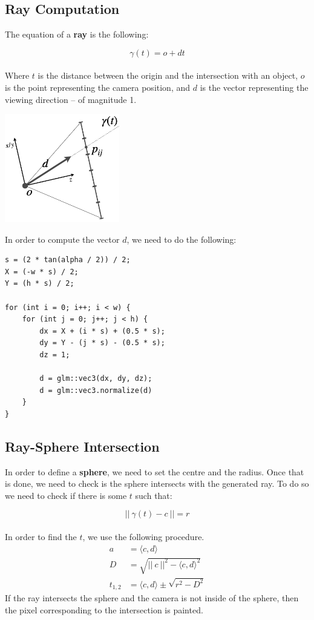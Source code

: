 \documentclass{article}
\begin{document}
\subsection{Ray Computation}
The equation of a \textbf{ray} is the following:

\[ \gamma(t) = o + dt \] \\
Where $t$ is the distance between the origin and the intersection with an object, $o$ is the point representing the camera position, and $d$ is the vector representing the viewing direction -- of magnitude 1.

\begin{center}
	\includegraphics[width=5cm]{ray_comp.png}
\end{center} 
In order to compute the vector $d$, we need to do the following:

\begin{lstlisting}[style=c++]
s = (2 * tan(alpha / 2)) / 2;
X = (-w * s) / 2;
Y = (h * s) / 2;

for (int i = 0; i++; i < w) {
	for (int j = 0; j++; j < h) {
		dx = X + (i * s) + (0.5 * s);
		dy = Y - (j * s) - (0.5 * s);
		dz = 1;
		
		d = glm::vec3(dx, dy, dz);
		d = glm::vec3.normalize(d)
	}
}
\end{lstlisting}

\subsection{Ray-Sphere Intersection}
In order to define a \textbf{sphere}, we need to set the centre and the radius. Once that is done, we need to check is the sphere intersects with the generated ray. To do so we need to check if there is some $t$ such that:

\[ ||~\gamma(t) - c~|| = r \] \\
In order to find the $t$, we use the following procedure.
\begin{align*}
	a & = \langle c, d \rangle \\
	D & = \sqrt{||~c~||^2 - \langle c, d \rangle^2} \\
	t_{1,2} & = \langle c,d \rangle \pm \sqrt{r^2 - D^2}
\end{align*}
If the ray intersects the sphere and the camera is not inside of the sphere, then the pixel corresponding to the intersection is painted.
\end{document}
